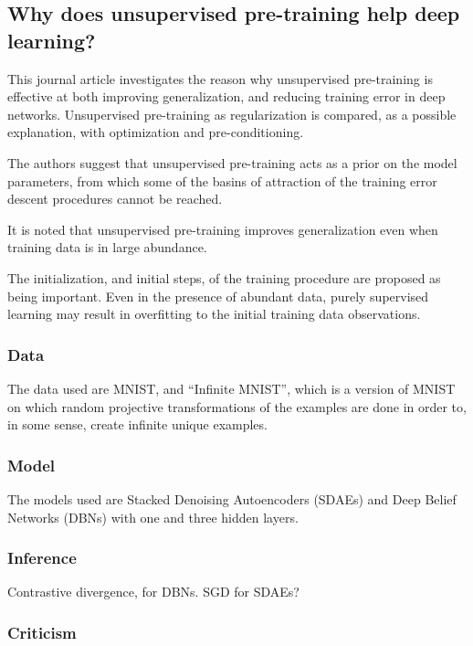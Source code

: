 \documentclass[a4paper, 12pt]{article}
\begin{document}
\subsection{Why does unsupervised pre-training help deep
            learning?~\citet{Erhan:2010:WUP:1756006.1756025}}

This journal article investigates the reason why unsupervised pre-training is
effective at both improving generalization, and reducing training error in deep
networks. Unsupervised pre-training as regularization is compared, as a possible
explanation, with optimization and pre-conditioning.

The authors suggest that unsupervised pre-training acts as a prior on the model
parameters, from which some of the basins of attraction of the training error
descent procedures cannot be reached.

It is noted that unsupervised pre-training improves generalization even when
training data is in large abundance.

The initialization, and initial steps, of the training procedure are proposed
as being important. Even in the presence of abundant data, purely supervised
learning may result in overfitting to the initial training data observations.


\subsubsection{Data}

The data used are MNIST, and ``Infinite MNIST'', which is a version of MNIST on
which random projective transformations of the examples are done in order to,
in some sense, create infinite unique examples.


\subsubsection{Model}

The models used are Stacked Denoising Autoencoders (SDAEs) and Deep Belief
Networks (DBNs) with one and three hidden layers.


\subsubsection{Inference}

Contrastive divergence, for DBNs. SGD for SDAEs?


\subsubsection{Criticism}
\end{document}

